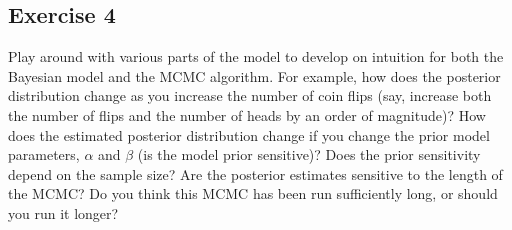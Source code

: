 \subsection{Exercise 4}
Play around with various parts of the model to develop on intuition for both the Bayesian model and the MCMC algorithm.
For example, how does the posterior distribution change as you increase the number of coin flips (say, increase both the number of flips and the number of heads by an order of magnitude)?
How does the estimated posterior distribution change if you change the prior model parameters, $\alpha$ and $\beta$ (\IE is the model prior sensitive)?
Does the prior sensitivity depend on the sample size?
Are the posterior estimates sensitive to the length of the MCMC?
Do you think this MCMC has been run sufficiently long, or should you run it longer?












